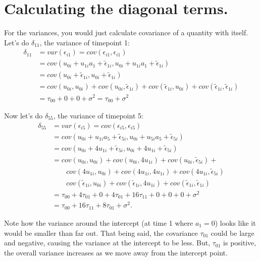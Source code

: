 \documentclass[
  letterpaper,
  DIV=11,
  numbers=noendperiod]{scrreprt}
\begin{document}
\hypertarget{calculating-the-diagonal-terms.}{%
\section{Calculating the diagonal
terms.}\label{calculating-the-diagonal-terms.}}

For the variances, you would just calculate covariance of a quantity
with itself. Let's do \(\delta_{11}\), the variance of timepoint 1:
\[\begin{aligned}
\delta_{11} &= var( \epsilon_{i1} ) = cov( \epsilon_{i1}, \epsilon_{i1} ) \\
   &= cov(  u_{0i} + u_{1i} a_1 + \tilde{\epsilon}_{1i},  u_{0i} + u_{1i} a_1 + \tilde{\epsilon}_{1i} ) \\
   &= cov(  u_{0i}  + \tilde{\epsilon}_{1i},  u_{0i} + \tilde{\epsilon}_{1i} ) \\
   &= cov(  u_{0i}, u_{0i} ) + cov( u_{0i},  \tilde{\epsilon}_{1i} ) + cov( \tilde{\epsilon}_{1i}, u_{0i}) + cov( \tilde{\epsilon}_{1i},\tilde{\epsilon}_{1i} )  \\
   &= \tau_{00} + 0 + 0 + \sigma^2 =  \tau_{00} + \sigma^2
\end{aligned}\]

Now let's do \(\delta_{55}\), the variance of timepoint 5:
\[\begin{aligned}
\delta_{55} &= var( \epsilon_{i5} ) = cov( \epsilon_{i5}, \epsilon_{i5} ) \\
   &= cov(  u_{0i} + u_{1i} a_5 + \tilde{\epsilon}_{5i},  u_{0i} + u_{5i} a_5 + \tilde{\epsilon}_{5i} ) \\
   &= cov(  u_{0i} + 4 u_{1i} + \tilde{\epsilon}_{5i},  u_{0i} + 4 u_{1i} + \tilde{\epsilon}_{5i} ) \\
   &= cov(  u_{0i}, u_{0i} ) + cov(  u_{0i}, 4 u_{1i} )  + cov( u_{0i},  \tilde{\epsilon}_{5i} ) + \\
    &\qquad cov( 4 u_{1i}, u_{0i} ) + cov( 4 u_{1i}, 4 u_{1i} )  + cov( 4 u_{1i}, \tilde{\epsilon}_{5i} ) \\
    & \qquad cov( \tilde{\epsilon}_{1i}, u_{0i}) + cov( \tilde{\epsilon}_{1i}, 4 u_{1i} )  + cov( \tilde{\epsilon}_{1i},\tilde{\epsilon}_{1i} )  \\
   &= \tau_{00} + 4 \tau_{01} + 0 + 4 \tau_{01} + 16 \tau_{11} + 0 + 0 + 0 + \sigma^2 \\
   &= \tau_{00} + 16 \tau_{11} + 8 \tau_{01} + \sigma^2 .
\end{aligned}\]

Note how the variance around the intercept (at time 1 where \(a_1 = 0\))
looks like it would be smaller than far out. That being said, the
covariance \(\tau_{01}\) could be large and negative, causing the
variance at the intercept to be less. But, \(\tau_{01}\) is positive,
the overall variance increases as we move away from the intercept point.
\end{document}
